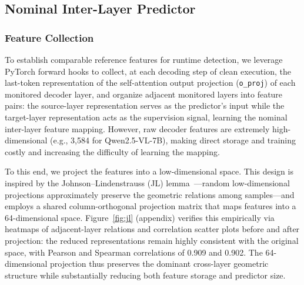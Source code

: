 \subsection{Nominal Inter-Layer Predictor}
\subsubsection{Feature Collection}
To establish comparable reference features for runtime detection, we leverage PyTorch forward hooks to collect, at each decoding step of clean execution, the last-token representation of the self-attention output projection (\texttt{o\_proj}) of each monitored decoder layer, and organize adjacent monitored layers into feature pairs: the source-layer representation serves as the predictor's input while the target-layer representation acts as the supervision signal, learning the nominal inter-layer feature mapping. However, raw decoder features are extremely high-dimensional (e.g., 3,584 for Qwen2.5-VL-7B), making direct storage and training costly and increasing the difficulty of learning the mapping.

To this end, we project the features into a low-dimensional space. This design is inspired by the Johnson–Lindenstrauss (JL) lemma~\cite{johnson1984extensions}—random low-dimensional projections approximately preserve the geometric relations among samples—and employs a shared column-orthogonal projection matrix that maps features into a 64-dimensional space. Figure~\ref{fig:jl} (appendix) verifies this empirically via heatmaps of adjacent-layer relations and correlation scatter plots before and after projection: the reduced representations remain highly consistent with the original space, with Pearson and Spearman correlations of 0.909 and 0.902. The 64-dimensional projection thus preserves the dominant cross-layer geometric structure while substantially reducing both feature storage and predictor size.


